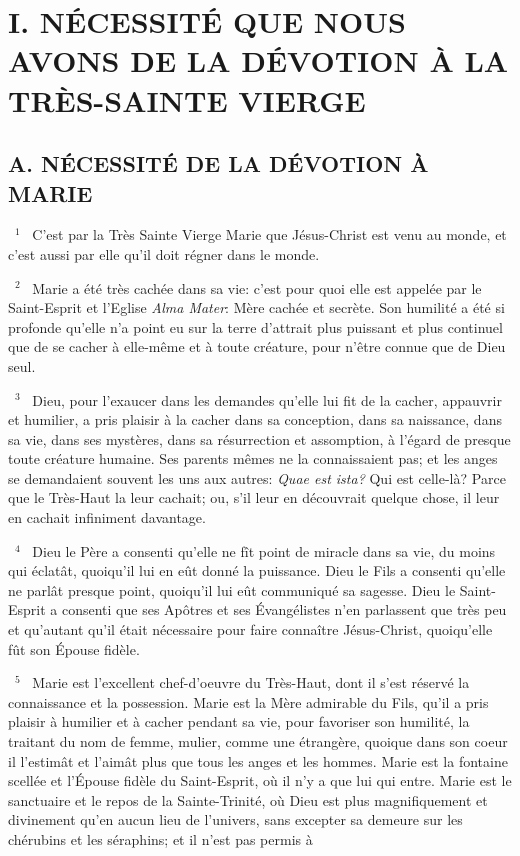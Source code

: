 \documentclass[paper=a5,pagesize=pdftex,fontsize=15pt,headinclude=on,twoside=off]{scrbook}
\newcommand{\negphantom}[1]{\settowidth{\dimen0}{#1}\hspace*{-\dimen0}}
\newcommand{\versenb}[1]{\par \vspace{10pt}~\negphantom{~${}^{#1}$~}${}^{#1}$~}
\newcommand{\latin}[1]{\emph{#1}}
\begin{document}
\section{I. NÉCESSITÉ QUE NOUS AVONS DE LA DÉVOTION À LA TRÈS-SAINTE VIERGE}
\subsection{A. NÉCESSITÉ DE LA DÉVOTION À MARIE}
\versenb{1} C'est par la Très Sainte Vierge Marie que Jésus-Christ est venu au monde, et c'est aussi par elle qu'il doit
régner dans le monde.
\versenb{2} Marie a été très cachée dans sa vie: c'est pour quoi elle est appelée par le Saint-Esprit et l'Eglise \latin{Alma Mater}:
Mère cachée et secrète. Son humilité a été si profonde qu'elle n'a point eu sur la terre d'attrait plus puissant et plus
continuel que de se cacher à elle-même et à toute créature, pour n'être connue que de Dieu seul.
\versenb{3} Dieu, pour l'exaucer dans les demandes qu'elle lui fit de la cacher, appauvrir et humilier, a pris plaisir à la
cacher dans sa conception, dans sa naissance, dans sa vie, dans ses mystères, dans sa résurrection et
assomption, à l'égard de presque toute créature humaine. Ses parents mêmes ne la connaissaient pas; et les
anges se demandaient souvent les uns aux autres: \latin{Quae est ista?} Qui est celle-là? Parce que le Très-Haut la leur
cachait; ou, s'il leur en découvrait quelque chose, il leur en cachait infiniment davantage.
\versenb{4} Dieu le Père a consenti qu'elle ne fît point de miracle dans sa vie, du moins qui éclatât, quoiqu'il lui en eût
donné la puissance. Dieu le Fils a consenti qu'elle ne parlât presque point, quoiqu'il lui eût communiqué sa
sagesse. Dieu le Saint-Esprit a consenti que ses Apôtres et ses Évangélistes n'en parlassent que très peu et
qu'autant qu'il était nécessaire pour faire connaître Jésus-Christ, quoiqu'elle fût son Épouse fidèle.
\versenb{5} Marie est l'excellent chef-d'oeuvre du Très-Haut, dont il s'est réservé la connaissance et la possession. Marie
est la Mère admirable du Fils, qu'il a pris plaisir à humilier et à cacher pendant sa vie, pour favoriser son humilité,
la traitant du nom de femme, mulier, comme une étrangère, quoique dans son coeur il l'estimât et l'aimât plus que
tous les anges et les hommes. Marie est la fontaine scellée et l'Épouse fidèle du Saint-Esprit, où il n'y a que lui qui
entre. Marie est le sanctuaire et le repos de la Sainte-Trinité, où Dieu est plus magnifiquement et divinement qu'en
aucun lieu de l'univers, sans excepter sa demeure sur les chérubins et les séraphins; et il n'est pas permis à
\end{document}
